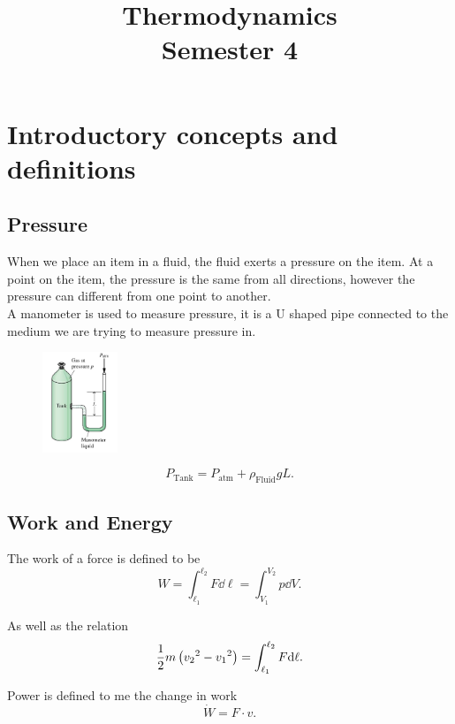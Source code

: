 \documentclass{report}
\title{\Huge{Thermodynamics}\\Semester 4}
\author{}
\date{}
\begin{document}
\maketitle
\newpage%
\tableofcontents
\pagebreak


\chapter{Introductory concepts and definitions}
\section{Pressure}

When we place an item in a fluid, the fluid exerts a pressure on the item. At a point on the item, the pressure is the same from all directions, however the pressure can different from one point to another.
\\
A manometer is used to measure pressure, it is a U shaped pipe connected to the medium we are trying to measure pressure in.

\begin{figure}[H]
	\centering
	\includegraphics[width=0.2\textwidth]{figs/man.png}
\end{figure}

\[
	P_\text{Tank} =  P_\text{atm} + \rho_\text{Fluid}gL
	.\]


\section{Work and Energy}

The work of a force is defined to be
\[
	W = \int_{\ell_1}^{\ell_2} F \dd{\ell} = \int_{V_1}^{V_2}p\dd{V}
	.\]

As well as the relation
\[
	\frac{1}{2}m\left({v_2}^2 - {v_1}^2\right) = \int_{\ell_1}^{\ell_2} F \mathrm{d}\ell
	.\]

Power is defined to me the change in work
\[
	\dot{W} = F\cdot v
	.\]
\end{document}
